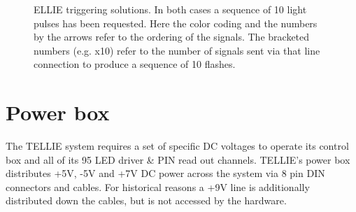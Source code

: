 \documentclass[12pt]{report}
\begin{document}
\begin{figure}[]
	\centering
	\newline
	\caption{ELLIE triggering solutions. In both cases a sequence of 10 light pulses has been requested. Here the color coding and the numbers by the arrows refer to the ordering of the signals. The bracketed numbers (e.g. x10) refer to the number of signals sent via that line connection to produce a sequence of 10 flashes.}
\end{figure}



\chapter{Power box}
\label{chap:PowerBox}
The TELLIE system requires a set of specific DC voltages to operate its control box and all of its 95 LED driver \& PIN read out channels. TELLIE's power box distributes +5V, -5V and +7V DC power across the system via 8 pin DIN connectors and cables. For historical reasons a +9V line is additionally distributed down the cables, but is not accessed by the hardware. %
\end{document}
